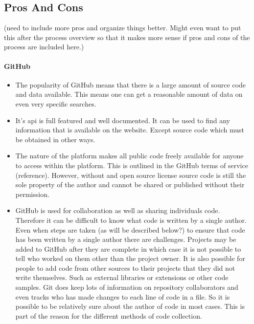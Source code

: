 \documentclass{article}
\begin{document}
\subsection{Pros And Cons}
(need to include more pros and organize things better. Might even want to put this after the process overview so that it makes more sense if pros and cons of the process are included here.)
\paragraph{GitHub}
\begin{itemize}
    \item The popularity of GitHub means that there is a large amount of source code and data available. This means one can get a reasonable amount of data on even very specific searches.

    \item It's api is full featured and well documented. It can be used to find any information that is available on the website. Except source code which must be obtained in other ways.
    
    \item The nature of the platform makes all public code freely available for anyone to access within the platform. This is outlined in the GitHub terms of service (reference). However, without and open source license source code is still the sole property of the author and cannot be shared or published without their permission.

    \item GitHub is used for collaboration as well as sharing individuals code. Therefore it can be difficult to know what code is written by a single author. Even when steps are taken (as will be described below?) to ensure that code has been written by a single author there are challenges. Projects may be added to GitHub after they are complete in which case it is not possible to tell who worked on them other than the project owner. It is also possible for people to add code from other sources to their projects that they did not write themselves. Such as external libraries or extensions or other code samples. Git does keep lots of information on repository collaborators and even tracks who has made changes to each line of code in a file. So it is possible to be relatively sure about the author of code in most cases. This is part of the reason for the different methods of code collection.


\end{itemize}
\end{document}

